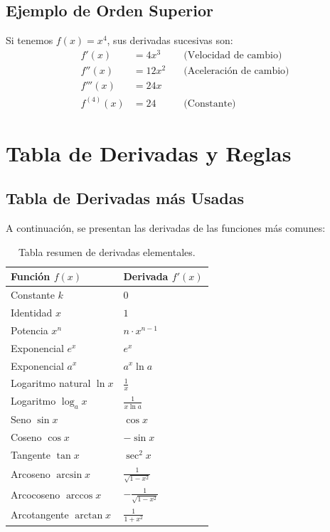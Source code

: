\documentclass[12pt,a4paper,openany,oneside]{book}
\begin{document}
\subsection{Ejemplo de Orden Superior}
Si tenemos $f(x) = x^4$, sus derivadas sucesivas son:
\begin{align*}
f'(x) &= 4x^3 \quad &\text{(Velocidad de cambio)}\\
f''(x) &= 12x^2 \quad &\text{(Aceleración de cambio)}\\
f'''(x) &= 24x \\
f^{(4)}(x) &= 24 \quad &\text{(Constante)}
\end{align*}

\section{Tabla de Derivadas y Reglas}

\subsection{Tabla de Derivadas más Usadas}
A continuación, se presentan las derivadas de las funciones más comunes:

\begin{table}[h]
\centering
\begin{tabular}{ll}
\toprule
\textbf{Función $f(x)$} & \textbf{Derivada $f'(x)$} \\ \midrule
Constante $k$ & $0$ \\
Identidad $x$ & $1$ \\
Potencia $x^n$ & $n \cdot x^{n-1}$ \\
Exponencial $e^x$ & $e^x$ \\
Exponencial $a^x$ & $a^x \ln a$ \\
Logaritmo natural $\ln x$ & $\frac{1}{x}$ \\
Logaritmo $\log_a x$ & $\frac{1}{x \ln a}$ \\
Seno $\sin x$ & $\cos x$ \\
Coseno $\cos x$ & $-\sin x$ \\
Tangente $\tan x$ & $\sec^2 x$ \\
Arcoseno $\arcsin x$ & $\frac{1}{\sqrt{1-x^2}}$ \\
Arcocoseno $\arccos x$ & $-\frac{1}{\sqrt{1-x^2}}$ \\
Arcotangente $\arctan x$ & $\frac{1}{1+x^2}$ \\ \bottomrule
\end{tabular}
\caption{Tabla resumen de derivadas elementales.}
\end{table}
\end{document}
